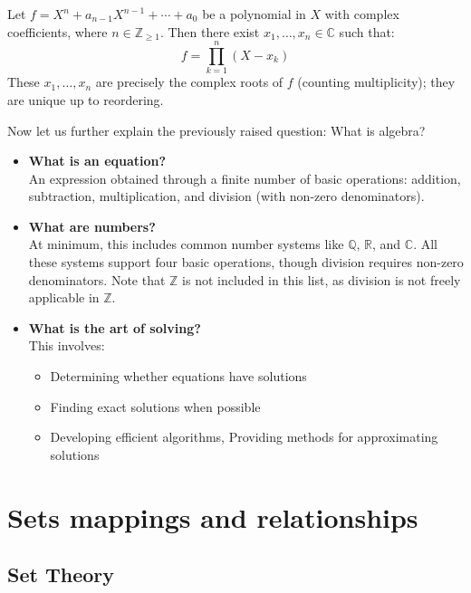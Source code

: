 \documentclass[11pt,lang=en]{elegantbook}
\begin{document}
\begin{theorem}
  Let $f = X^n + a_{n-1}X^{n-1} + \cdots + a_0$ be a polynomial in $X$ with complex coefficients, where $n \in \mathbb{Z}_{\geq 1}$. Then there exist $x_1,\ldots,x_n \in \mathbb{C}$ such that:
  \[
    f = \prod_{k=1}^n (X-x_k)
  \]
  These $x_1,\ldots,x_n$ are precisely the complex roots of $f$ (counting multiplicity); they are unique up to reordering.
\end{theorem}


Now let us further explain the previously raised question: What is algebra?

\begin{itemize}
  \item \textbf{What is an equation?} \\
    An expression obtained through a finite number of basic operations: addition, subtraction, multiplication, and division (with non-zero denominators).
    
  \item \textbf{What are numbers?} \\
    At minimum, this includes common number systems like $\mathbb{Q}$, $\mathbb{R}$, and $\mathbb{C}$. All these systems support four basic operations, though division requires non-zero denominators. Note that $\mathbb{Z}$ is not included in this list, as division is not freely applicable in $\mathbb{Z}$.
    
  \item \textbf{What is the art of solving?} \\
    This involves:
    \begin{itemize}
      \item Determining whether equations have solutions
      \item Finding exact solutions when possible
      \item Developing efficient algorithms, Providing methods for approximating solutions
    \end{itemize}
\end{itemize}


\chapter{Sets mappings and relationships}

\section{Set Theory}
\end{document}
